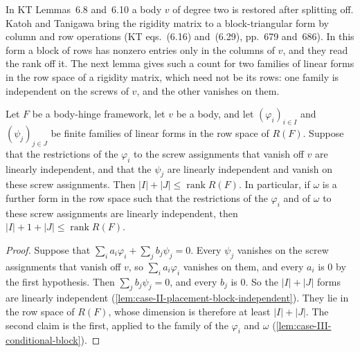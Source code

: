 In KT Lemmas~6.8 and~6.10 a body $v$ of degree two is restored after
splitting off. Katoh and Tanigawa bring the rigidity matrix to a
block-triangular form by column and row operations (KT eqs.~(6.16)
and~(6.29), pp.~679 and~686). In this form a block of rows has nonzero
entries only in the columns of $v$, and they read the rank off it. The
next lemma gives such a count for two families of linear forms in the
row space of a rigidity matrix, which need not be its rows: one family
is independent on the screws of $v$, and the other vanishes on them.

\begin{lemma}
  \label{lem:rigidityRows-pinned-placement-rank-add}
  \leanok
  Let $F$ be a body-hinge framework, let $v$ be a body, and let $(\varphi_i)_{i \in I}$ and $(\psi_j)_{j \in J}$ be
  finite families of linear forms in the row space of $R(F)$. Suppose
  that the restrictions of the $\varphi_i$ to the screw assignments that
  vanish off $v$ are linearly independent, and that the $\psi_j$ are
  linearly independent and vanish on these screw assignments. Then
  $|I| + |J| \le \operatorname{rank} R(F)$. In particular, if $\omega$ is
  a further form in the row space such that the restrictions of the
  $\varphi_i$ and of $\omega$ to these screw assignments are linearly
  independent, then $|I| + 1 + |J| \le \operatorname{rank} R(F)$.
\end{lemma}
\begin{proof}
  \leanok
  Suppose that $\sum_i a_i \varphi_i + \sum_j b_j \psi_j = 0$. Every
  $\psi_j$ vanishes on the screw assignments that vanish off $v$, so
  $\sum_i a_i \varphi_i$ vanishes on them, and every $a_i$ is $0$ by the
  first hypothesis. Then $\sum_j b_j \psi_j = 0$, and every $b_j$ is $0$.
  So the $|I| + |J|$ forms are linearly independent
  (\cref{lem:case-II-placement-block-independent}). They lie in the row
  space of $R(F)$, whose dimension is therefore at least $|I| + |J|$. The
  second claim is the first, applied to the family of the $\varphi_i$
  and $\omega$ (\cref{lem:case-III-conditional-block}).
\end{proof}

